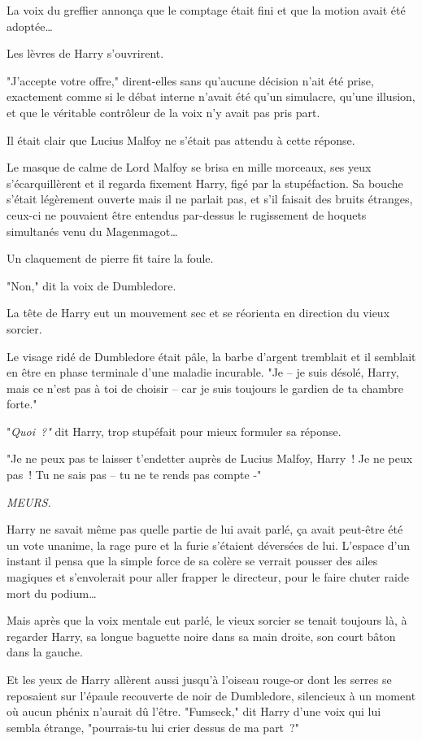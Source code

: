 La voix du greffier annonça que le comptage était fini et que la motion avait été adoptée…

Les lèvres de Harry s'ouvrirent.

"J'accepte votre offre," dirent-elles sans qu'aucune décision n'ait été prise, exactement comme si le débat interne n'avait été qu'un simulacre, qu'une illusion, et que le véritable contrôleur de la voix n'y avait pas pris part.

Il était clair que Lucius Malfoy ne s'était pas attendu à cette réponse.

Le masque de calme de Lord Malfoy se brisa en mille morceaux, ses yeux s'écarquillèrent et il regarda fixement Harry, figé par la stupéfaction. Sa bouche s'était légèrement ouverte mais il ne parlait pas, et s'il faisait des bruits étranges, ceux-ci ne pouvaient être entendus par-dessus le rugissement de hoquets simultanés venu du Magenmagot…

Un claquement de pierre fit taire la foule.

"Non," dit la voix de Dumbledore.

La tête de Harry eut un mouvement sec et se réorienta en direction du vieux sorcier.

Le visage ridé de Dumbledore était pâle, la barbe d'argent tremblait et il semblait en être en phase terminale d'une maladie incurable. "Je -- je suis désolé, Harry, mais ce n'est pas à toi de choisir -- car je suis toujours le gardien de ta chambre forte."

"\emph{Quoi~?"} dit Harry, trop stupéfait pour mieux formuler sa réponse.

"Je ne peux pas te laisser t'endetter auprès de Lucius Malfoy, Harry~! Je ne peux pas~! Tu ne sais pas -- tu ne te rends pas compte -"

\emph{MEURS.}

Harry ne savait même pas quelle partie de lui avait parlé, ça avait peut-être été un vote unanime, la rage pure et la furie s'étaient déversées de lui. L'espace d'un instant il pensa que la simple force de sa colère se verrait pousser des ailes magiques et s'envolerait pour aller frapper le directeur, pour le faire chuter raide mort du podium…

Mais après que la voix mentale eut parlé, le vieux sorcier se tenait toujours là, à regarder Harry, sa longue baguette noire dans sa main droite, son court bâton dans la gauche.

Et les yeux de Harry allèrent aussi jusqu'à l'oiseau rouge-or dont les serres se reposaient sur l'épaule recouverte de noir de Dumbledore, silencieux à un moment où aucun phénix n'aurait dû l'être. "Fumseck," dit Harry d'une voix qui lui sembla étrange, "pourrais-tu lui crier dessus de ma part~?"

